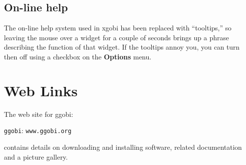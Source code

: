 \documentclass[11pt]{article}
\begin{document}
\subsection{On-line help}

The on-line help system used in xgobi has been replaced with
``tooltips,'' so leaving the mouse over a widget for a couple of
seconds brings up a phrase describing the function of that widget.
If the tooltips annoy you, you can turn then off using a
checkbox on the {\bf Options} menu.

\section*{Web Links}

The web site for ggobi:

\centerline{{\tt ggobi}: {\tt www.ggobi.org}}

contains details on downloading and installing software, related
documentation and a picture gallery.

\newpage

\end{document}
